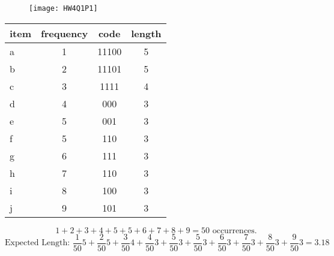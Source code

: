 \documentclass{article}
\newcommand{\eqn}[1]{\[#1\]}
\begin{document}
{{\begin{figure}[h]
  \texttt{[image: HW4Q1P1]}
\end{figure}

\begin{tabular}{l|ccc}
  item & frequency & code & length \\
  \hline
  a & 1 & 11100 & 5 \\
  b & 2 & 11101 & 5 \\
  c & 3 & 1111 & 4 \\
  d & 4 & 000 & 3 \\
  e & 5 & 001 & 3 \\
  f & 5 & 110 & 3 \\
  g & 6 & 111 & 3 \\
  h & 7 & 110 & 3 \\
  i & 8 & 100 & 3 \\
  j & 9 & 101 & 3
\end{tabular}

\eqn{1 + 2 + 3 + 4 + 5 + 5 + 6 + 7 + 8 + 9 = 50 \textrm{ occurrences.}}
\eqn{ \textrm{Expected Length: } \frac{1}{50}5 + \frac{2}{50}5 + \frac{3}{50}4 + \frac{4}{50}3 + \frac{5}{50}3 + \frac{5}{50}3 + \frac{6}{50}3 + \frac{7}{50}3 + \frac{8}{50}3 + \frac{9}{50}3 = 3.18}


}
}
\end{document}
